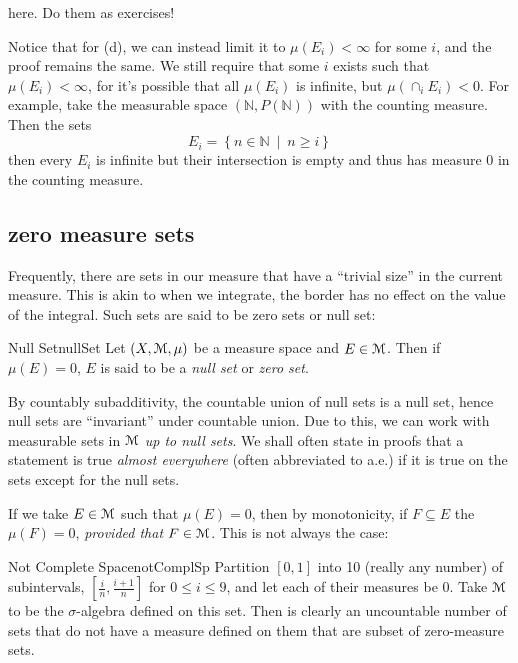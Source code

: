 \documentclass[oneside]{book}
\newcommand{\N}{\mathbb{N}}
\newcommand{\MM}{\EuScript{M}}
\newcommand{\EM}{\EuScript{M}}
\newcommand{\sse}{\subseteq}
\newcommand{\set}[2]{\left\{#1 \ \middle|\ #2\right\}}
\begin{document}
\begin{Proof}
	here. Do them as exercises!
\end{Proof}

Notice that for (d), we can instead limit it to $\mu(E_i) < \infty$ for some $i$, and the proof remains the same. We
still require that some $i$ exists such that $\mu(E_i) < \infty$, for it's possible that all $\mu(E_i)$ is infinite, but
$\mu(\cap_i E_i) < 0$. For example, take the measurable space $(\N, P(\N))$ with the counting measure. Then the sets
\[
	E_i = \set{n \in \N}{ n \ge i}
\]
then every $E_i$ is infinite but their intersection is empty and thus has measure $0$ in the counting measure. 

\subsection*{zero measure sets}

Frequently, there are sets in our measure that have a ``trivial size'' in the current measure. This is akin to when we
integrate, the border has no effect on the value of the integral. Such sets are said to be zero sets or null set:
\begin{defn}{Null Set}{nullSet}
	Let $(X, \MM, \mu)$ be a measure space and $E \in \MM$. Then if $\mu(E) = 0$, $E$ is said to be a \emph{null set} or
	\emph{zero set}. 
\end{defn}

By countably subadditivity, the countable union of null sets is a null set, hence null sets are ``invariant'' under
countable union. Due to this, we can work with measurable sets in $\MM$ \emph{up to null sets}. We shall often state in
proofs that a statement is true \emph{almost everywhere} (often abbreviated to a.e.) if it is true on the sets except
for the null sets. 

If we take $E \in \MM$ such that $\mu(E) = 0$, then by monotonicity, if $F \sse E$ the $\mu(F) = 0$, \emph{provided that
$F \in \MM$}. This is not always the case:

\begin{example}{Not Complete Space}{notComplSp}
	Partition $[0,1]$ into 10 (really any number) of subintervals, $\left[ \frac{i}{n}, \frac{i+1}{n}\right]$ for $0 \le
	i \le 9$, and let each of their measures be $0$. Take $\EM$ to be the $\sigma$-algebra defined on this set. Then
	is clearly an uncountable number of sets that do not have a measure defined on them that are subset of zero-measure
	sets.
\end{example}
\end{document}
